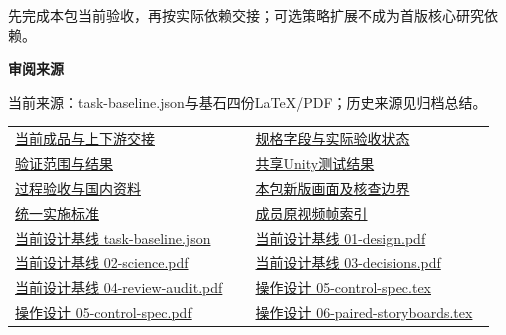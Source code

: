 \documentclass[11pt,a4paper]{article}
\newcommand{\reviewsubsection}[1]{\par\Needspace{4\baselineskip}\vspace{4pt}\begin{center}{\titlelatin\titlecjk\bfseries\fontsize{12}{18}\selectfont #1}\end{center}}
\begin{document}
先完成本包当前验收，再按实际依赖交接；可选策略扩展不成为首版核心研究依赖。


\begin{minipage}{\linewidth}
\reviewsubsection{3.4 审阅来源}
当前来源：task-\allowbreak{}baseline.json与基石四份LaTeX/\allowbreak{}PDF；历史来源见归档总结。


\begingroup\small\setlength{\tabcolsep}{4pt}\begin{tabular}{@{}p{0.48\linewidth}p{0.48\linewidth}@{}}
\href{file:///D:/Agent/srp/agent/tasks/U-08/outputs/current-product.md}{当前成品与上下游交接} & \href{file:///D:/Agent/srp/agent/tasks/U-08/outputs/current-product.json}{规格字段与实际验收状态}\\[4pt]
\href{file:///D:/Agent/srp/agent/tasks/U-08/evidence/verification.json}{验证范围与结果} & \href{file:///D:/Agent/srp/agent/tasks/U-08/evidence/editmode-results.xml}{共享Unity测试结果}\\[4pt]
\href{file:///D:/Agent/srp/agent/tasks/U-08/TASK.md}{过程验收与国内资料} & \href{file:///D:/Agent/srp/agent/tasks/U-08/outputs/current-implementation-evidence.md}{本包新版画面及核查边界}\\[4pt]
\href{file:///D:/Agent/srp/agent/design/weather/2026-10-08_Storm\%E4\%B8\%8E\%E7\%BA\%AF\%E7\%B2\%92\%E5\%AD\%90\%E5\%8F\%8C\%E7\%8E\%AF\%E5\%AE\%9E\%E6\%96\%BD\%E6\%A0\%87\%E5\%87\%86.md}{统一实施标准} & \href{file:///D:/Agent/srp/human/assets/previews/2026-10-08/member-storm-particle-rings/frame-index.json}{成员原视频帧索引}\\[4pt]
\href{file:///D:/Agent/srp/agent/design/design-foundation-20261008/task-baseline.json}{当前设计基线 task-\allowbreak{}baseline.json} & \href{file:///D:/Agent/srp/agent/design/design-foundation-20261008/01-design.pdf}{当前设计基线 01-\allowbreak{}design.pdf}\\[4pt]
\href{file:///D:/Agent/srp/agent/design/design-foundation-20261008/02-science.pdf}{当前设计基线 02-\allowbreak{}science.pdf} & \href{file:///D:/Agent/srp/agent/design/design-foundation-20261008/03-decisions.pdf}{当前设计基线 03-\allowbreak{}decisions.pdf}\\[4pt]
\href{file:///D:/Agent/srp/agent/design/design-foundation-20261008/04-review-audit.pdf}{当前设计基线 04-\allowbreak{}review-\allowbreak{}audit.pdf} & \href{file:///D:/Agent/srp/agent/design/design-foundation-20261008/05-control-spec.tex}{操作设计 05-\allowbreak{}control-\allowbreak{}spec.tex}\\[4pt]
\href{file:///D:/Agent/srp/agent/design/design-foundation-20261008/05-control-spec.pdf}{操作设计 05-\allowbreak{}control-\allowbreak{}spec.pdf} & \href{file:///D:/Agent/srp/agent/design/design-foundation-20261008/06-paired-storyboards.tex}{操作设计 06-\allowbreak{}paired-\allowbreak{}storyboards.tex}\\[4pt]

\end{tabular}
\end{minipage}
\end{document}
